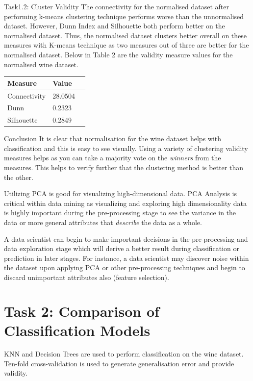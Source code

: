 \documentclass[11pt]{article}
\begin{document}
\pagebreak\begin{subsection}{Task1.2: Cluster Validity}
    The connectivity for the normalised dataset after performing k-means clustering technique performs worse than the unnormalised dataset. However, Dunn Index and Silhouette both perform better on the normalised dataset. Thus, the normalised dataset clusters better overall on these measures with K-means technique as two measures out of three are better for the normalised dataset. Below in Table 2 are the validity measure values for the normalised wine dataset. 
 \begin{center}   
 \begin{tabular}{@{}llr@{}}
	\toprule[1.5pt]
	Measure & Value \\
	\toprule[1.5pt]
	Connectivity & 28.0504 \\ \midrule
	Dunn & 0.2323 \\ \midrule
	Silhouette & 0.2849 \\
	\bottomrule[1.25pt]
    \end{tabular}
\end{center}
\end{subsection}
\begin{subsection}{Conclusion}
    It is clear that normalisation for the wine dataset helps with classification and this is easy to see visually. Using a variety of clustering validity measures helps as you can take a majority vote on the \textit{winners} from the measures. This helps to verify further that the clustering method is better than the other. 
    
Utilizing PCA is good for visualizing high-dimensional data. PCA Analysis is critical within data mining as visualizing and exploring high dimensionality data is highly important during the pre-processing stage to see the variance in the data or more general attributes that \textit{describe} the data as a whole. 

A data scientist can begin to make important decisions in the pre-processing and data exploration stage which will derive a better result during classification or prediction in later stages. For instance, a data scientist may discover noise within the dataset upon applying PCA or other pre-processing techniques and begin to discard unimportant attributes also (feature selection).
\end{subsection}

\pagebreak\section{Task 2: Comparison of Classification Models}
KNN and Decision Trees are used to perform classification on the wine dataset. Ten-fold cross-validation is used to generate generalisation error and provide validity.
\end{document}
